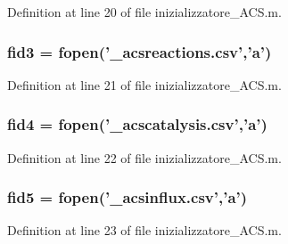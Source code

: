 Definition at line 20 of file inizializzatore\-\_\-\-A\-C\-S.\-m.

\hypertarget{a00110_a153e3250d4161f9bea4c140498016d94}{
\subsubsection[{fid3}]{\setlength{\rightskip}{0pt plus 5cm}fid3 = fopen('\-\_\-acsreactions.\-csv','{\bf a}')}}\label{a00110_a153e3250d4161f9bea4c140498016d94}


Definition at line 21 of file inizializzatore\-\_\-\-A\-C\-S.\-m.

\hypertarget{a00110_a28f0b3b80ef3c84a4a00660a307d2147}{
\subsubsection[{fid4}]{\setlength{\rightskip}{0pt plus 5cm}fid4 = fopen('\-\_\-acscatalysis.\-csv','{\bf a}')}}\label{a00110_a28f0b3b80ef3c84a4a00660a307d2147}


Definition at line 22 of file inizializzatore\-\_\-\-A\-C\-S.\-m.

\hypertarget{a00110_af5f7ad66ed343bca8289a4d44dbff04f}{
\subsubsection[{fid5}]{\setlength{\rightskip}{0pt plus 5cm}fid5 = fopen('\-\_\-acsinflux.\-csv','{\bf a}')}}\label{a00110_af5f7ad66ed343bca8289a4d44dbff04f}


Definition at line 23 of file inizializzatore\-\_\-\-A\-C\-S.\-m.

